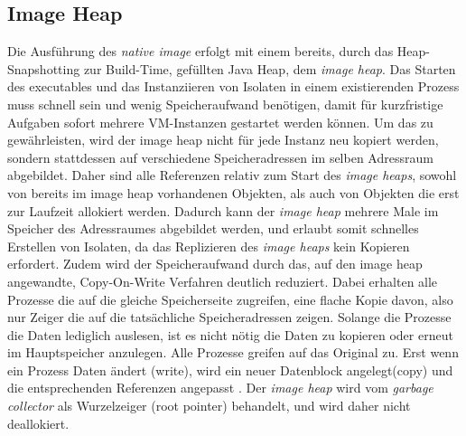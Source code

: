 \subsection{Image Heap}
\label{subsec:imageheap}

Die Ausführung des \textit{native image} erfolgt mit einem bereits, durch das Heap-Snapshotting zur Build-Time, gefüllten Java Heap,
dem \textit{image heap}. Das Starten des executables und das Instanziieren von Isolaten in einem existierenden Prozess muss
schnell sein und wenig Speicheraufwand benötigen, damit für kurzfristige Aufgaben sofort mehrere VM-Instanzen gestartet werden können.
Um das zu gewährleisten, wird der image heap nicht für jede Instanz neu kopiert werden, sondern stattdessen auf verschiedene Speicheradressen im selben Adressraum
abgebildet. Daher sind alle Referenzen relativ zum Start des \textit{image heaps}, sowohl von bereits im image heap vorhandenen Objekten, als auch von Objekten die 
erst zur Laufzeit allokiert werden. Dadurch kann der \textit{image heap} mehrere Male im Speicher des Adressraumes abgebildet werden, und erlaubt somit
schnelles Erstellen von Isolaten, da das Replizieren des \textit{image heaps} kein Kopieren erfordert.\newline
Zudem wird der Speicheraufwand durch das, auf den
image heap angewandte, Copy-On-Write Verfahren deutlich reduziert. Dabei erhalten alle Prozesse die auf die gleiche Speicherseite zugreifen, eine flache Kopie davon, also nur Zeiger die auf die tatsächliche Speicheradressen zeigen. Solange die Prozesse die Daten lediglich auslesen, ist es nicht nötig die Daten zu kopieren oder erneut im Hauptspeicher anzulegen. Alle Prozesse greifen auf das \grqq{}Original\grqq{} zu. Erst wenn ein Prozess Daten ändert (write), wird ein neuer Datenblock angelegt(copy) und die entsprechenden Referenzen angepasst \parencite{bovet2002understanding}.
Der \textit{image heap} wird vom \textit{garbage collector} als Wurzelzeiger (root pointer) behandelt, und wird daher nicht deallokiert.
